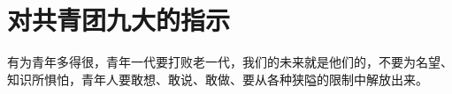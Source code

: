 \section[对共青团九大的指示（一九六四年）]{对共青团九大的指示}


有为青年多得很，青年一代要打败老一代，我们的未来就是他们的，不要为名望、知识所惧怕，青年人要敢想、敢说、敢做、要从各种狭隘的限制中解放出来。


